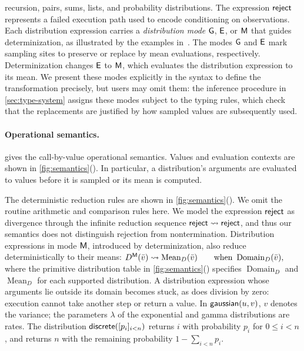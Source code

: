 \noindent recursion, pairs, sums, lists, and probability distributions. The expression $\mathsf{reject}$ represents a failed execution path used to encode conditioning on observations. Each distribution expression carries a \emph{distribution mode} $\mathsf{G}$, $\mathsf{E}$, or $\mathsf{M}$ that guides determinization, as illustrated by the examples in~. The modes $\mathsf{G}$ and $\mathsf{E}$ mark sampling sites to preserve or replace by mean evaluations, respectively. Determinization changes $\mathsf{E}$ to $\mathsf{M}$, which evaluates the distribution expression to its mean. We present these modes explicitly in the syntax to define the transformation precisely, but users may omit them: the inference procedure in \cref{sec:type-system} assigns these modes subject to the typing rules, which check that the replacements are justified by how sampled values are subsequently used.


\paragraph{Operational semantics.}
 gives the call-by-value operational semantics.
Values and evaluation contexts are shown in
\cref{fig:semantics}(). In particular, a distribution's arguments are evaluated to values before it is sampled or its mean is computed.

The deterministic reduction rules are shown in \cref{fig:semantics}(). We omit the
routine arithmetic and comparison rules here. We model the expression $\mathsf{reject}$ as divergence through the infinite reduction sequence $\mathsf{reject}\rightsquigarrow\mathsf{reject}$, and thus our semantics does not distinguish rejection from nontermination. Distribution expressions in
mode $\mathsf{M}$, introduced by determinization, also reduce deterministically
to their means:
\(
  D^{\mathsf{M}}(\bar v)
  \rightsquigarrow
  \operatorname{Mean}_D(\bar v)
  \qquad
  \text{when }\operatorname{Domain}_D(\bar v),
\) 
where the primitive distribution table in
\cref{fig:semantics}() specifies
$\operatorname{Domain}_D$ and $\operatorname{Mean}_D$ for each supported
distribution. A distribution expression whose arguments lie outside its
domain becomes stuck, as does division by zero: execution cannot take another step or return a value. In $\mathsf{gaussian}(u,v)$, $v$ denotes
the variance; the parameters $\lambda$ of the exponential and gamma
distributions are rates. The distribution
$\mathsf{discrete}([p_i]_{i<n})$ returns $i$ with probability $p_i$ for
$0\leq i<n$, and returns $n$ with the remaining probability
$1-\sum_{i<n}p_i$.

